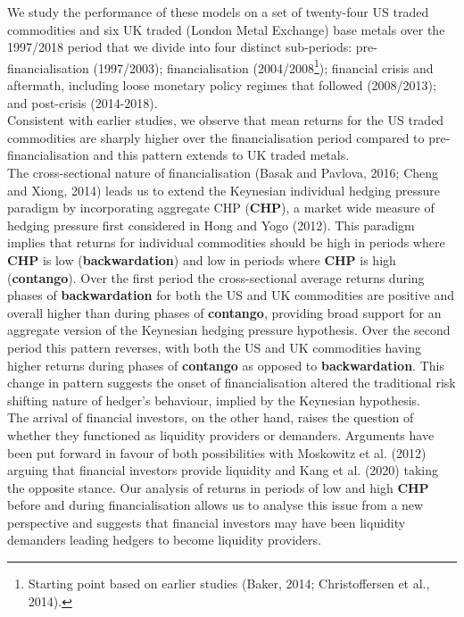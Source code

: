 \documentclass[]{elsarticle} %
\begin{document}
We study the performance of these models on a set of twenty-four US traded commodities and six UK traded (London Metal Exchange) base metals over the 1997/2018 period that we divide into four distinct sub-periods: pre-financialisation (1997/2003); financialisation (2004/2008\footnote{Starting point based on earlier studies (Baker, 2014; Christoffersen et al., 2014).}); financial crisis and aftermath, including loose monetary policy regimes that followed (2008/2013); and post-crisis (2014-2018).\\
Consistent with earlier studies, we observe that mean returns for the US traded commodities are sharply higher over the financialisation period compared to pre-financialisation and this pattern extends to UK traded metals.\\
The cross-sectional nature of financialisation (Basak and Pavlova, 2016; Cheng and Xiong, 2014) leads us to extend the Keynesian individual hedging pressure paradigm by incorporating aggregate CHP (\textbf{CHP}), a market wide measure of hedging pressure first considered in Hong and Yogo (2012). This paradigm implies that returns for individual commodities should be high in periods where \textbf{CHP} is low (\textbf{backwardation}) and low in periods where \textbf{CHP} is high (\textbf{contango}). Over the first period the cross-sectional average returns during phases of \textbf{backwardation} for both the US and UK commodities are positive and overall higher than during phases of \textbf{contango}, providing broad support for an aggregate version of the Keynesian hedging pressure hypothesis. Over the second period this pattern reverses, with both the US and UK commodities having higher returns during phases of \textbf{contango} as opposed to \textbf{backwardation}. This change in pattern suggests the onset of financialisation altered the traditional risk shifting nature of hedger's behaviour, implied by the Keynesian hypothesis.\\
The arrival of financial investors, on the other hand, raises the question of whether they functioned as liquidity providers or demanders. Arguments have been put forward in favour of both possibilities with Moskowitz et al. (2012) arguing that financial investors provide liquidity and Kang et al. (2020) taking the opposite stance. Our analysis of returns in periods of low and high \textbf{CHP} before and during financialisation allows us to analyse this issue from a new perspective and suggests that financial investors may have been liquidity demanders leading hedgers to become liquidity providers.\\
\end{document}
